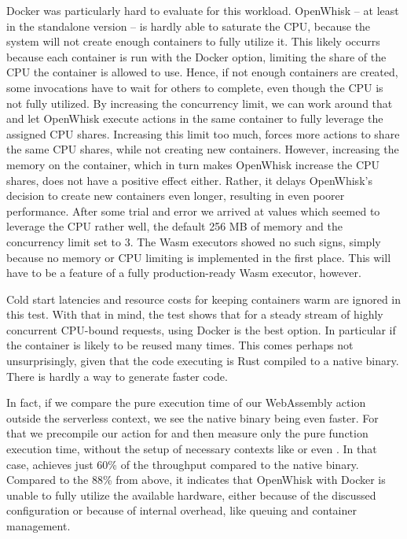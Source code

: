 Docker was particularly hard to evaluate for this workload. OpenWhisk -- at least in the standalone version -- is hardly able to saturate the CPU, because the system will not create enough containers to fully utilize it.
This likely occurrs because each container is run with the  Docker option, limiting the share of the CPU the container is allowed to use. Hence, if not enough containers are created, some invocations have to wait for others to complete, even though the CPU is not fully utilized.
By increasing the concurrency limit, we can work around that and let OpenWhisk execute actions in the same container to fully leverage the assigned CPU shares. Increasing this limit too much, forces more actions to share the same CPU shares, while not creating new containers.
However, increasing the memory on the container, which in turn makes OpenWhisk increase the CPU shares, does not have a positive effect either. Rather, it delays OpenWhisk's decision to create new containers even longer, resulting in even poorer performance. After some trial and error we arrived at values which seemed to leverage the CPU rather well, the default 256 MB of memory and the concurrency limit set to 3.
The Wasm executors showed no such signs, simply because no memory or CPU limiting is implemented in the first place. This will have to be a feature of a fully production-ready Wasm executor, however.

Cold start latencies and resource costs for keeping containers warm are ignored in this test. With that in mind, the test shows that for a steady stream of highly concurrent CPU-bound requests, using Docker is the best option. In particular if the container is likely to be reused many times. This comes perhaps not unsurprisingly, given that the code executing is Rust compiled to a native  binary. There is hardly a way to generate faster code.

In fact, if we compare the pure execution time of our WebAssembly action outside the serverless context, we see the native binary being even faster. For that we precompile our action for  and then measure only the pure function execution time, without the setup of necessary contexts like  or even . In that case,  achieves just 60\% of the throughput compared to the native binary. Compared to the 88\% from above, it indicates that OpenWhisk with Docker is unable to fully utilize the available hardware, either because of the discussed configuration or because of internal overhead, like queuing and container management.

